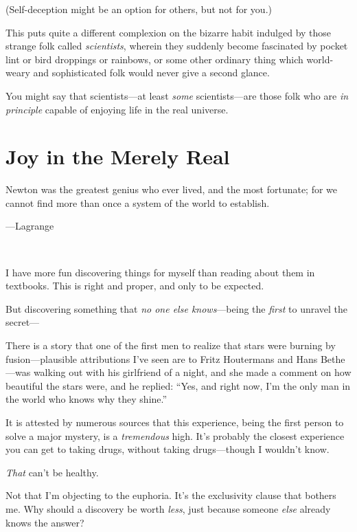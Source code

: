 {
 (Self-deception might be an option for others, but not for you.)}

{
 This puts quite a different complexion on the bizarre habit
indulged by those strange folk called \textit{scientists}, wherein they
suddenly become fascinated by pocket lint or bird droppings or
rainbows, or some other ordinary thing which world-weary and
sophisticated folk would never give a second glance.}

{
 You might say that scientists---at least \textit{some}
scientists---are those folk who are \textit{in principle} capable of
enjoying life in the real universe.}

\myendsectiontext

\chapter{Joy in the Merely Real}


{
 Newton was the greatest genius who ever lived, and the most
fortunate; for we cannot find more than once a system of the world to
establish.}

{\raggedleft
 {}---Lagrange
\par}


\bigskip

{
 ~}

{
 I have more fun discovering things for myself than reading about
them in textbooks. This is right and proper, and only to be expected.}

{
 But discovering something that \textit{no one else
knows}{}---being the \textit{first} to unravel the secret---}

{
 There is a story that one of the first men to realize that stars
were burning by fusion---plausible attributions I've
seen are to Fritz Houtermans and Hans Bethe{}---was walking out with
his girlfriend of a night, and she made a comment on how beautiful the
stars were, and he replied: ``Yes, and right now,
I'm the only man in the world who knows why they
shine.''}

{
 It is attested by numerous sources that this experience, being the
first person to solve a major mystery, is a \textit{tremendous} high.
It's probably the closest experience you can get to
taking drugs, without taking drugs---though I wouldn't
know.}

{
 \textit{That} can't be healthy.}

{
 Not that I'm objecting to the euphoria.
It's the exclusivity clause that bothers me. Why should
a discovery be worth \textit{less}, just because someone \textit{else}
already knows the answer?}

